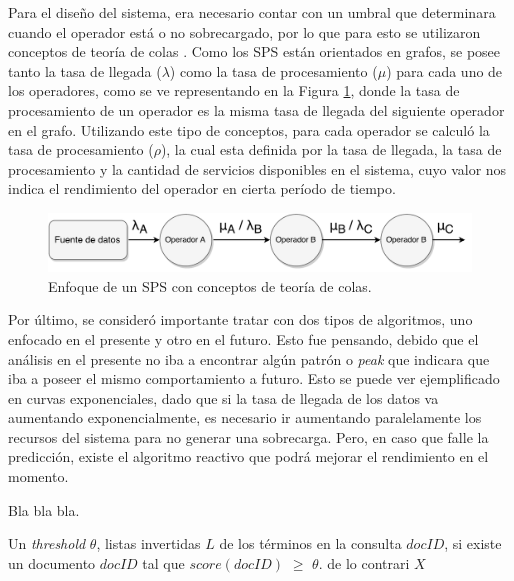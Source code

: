 Para el diseño del sistema, era necesario contar con un umbral que determinara cuando el operador está o no sobrecargado, por lo que para esto se utilizaron conceptos de teoría de colas \citep{bose2013introduction}. Como los SPS están orientados en grafos, se posee tanto la tasa de llegada ($\lambda$) como la tasa de procesamiento ($\mu$) para cada uno de los operadores, como se ve representando en la Figura \ref{fig:analisisTeoriaColas}, donde la tasa de procesamiento de un operador es la misma tasa de llegada del siguiente operador en el grafo. Utilizando este tipo de conceptos, para cada operador se calculó la tasa de procesamiento ($\rho$), la cual esta definida por la tasa de llegada, la tasa de procesamiento y la cantidad de servicios disponibles en el sistema, cuyo valor nos indica el rendimiento del operador en cierta período de tiempo.

\begin{figure}[!hb]
	\centering
		\includegraphics[scale=0.6]{images/AnalisisTeoriaColas.pdf}
	\caption{Enfoque de un SPS con conceptos de teoría de colas.}
	\label{fig:analisisTeoriaColas}
\end{figure}

Por último, se consideró importante tratar con dos tipos de algoritmos, uno enfocado en el presente y otro en el futuro. Esto fue pensando, debido que el análisis en el presente no iba a encontrar algún patrón o \textit{peak} que indicara que iba a poseer el mismo comportamiento a futuro. Esto se puede ver ejemplificado en curvas exponenciales, dado que si la tasa de llegada de los datos va aumentando exponencialmente, es necesario ir aumentando paralelamente los recursos del sistema para no generar una sobrecarga. Pero, en caso que falle la predicción, existe el algoritmo reactivo que podrá mejorar el rendimiento en el momento.



\begin{algorithm}[tp]
	\caption{Bla bla bla.}
	\label{alg:algoritmoPrueba}
	\begin{algorithmic}[1]
	\REQUIRE Un \textit{threshold} $\theta$, listas invertidas $L$ de los términos en la consulta
	\ENSURE $docID$, si existe un documento $docID$ tal que $score(docID)$ $\geq$ $\theta$. de lo contrari
	\STATE $X$
	\end{algorithmic}
\end{algorithm}